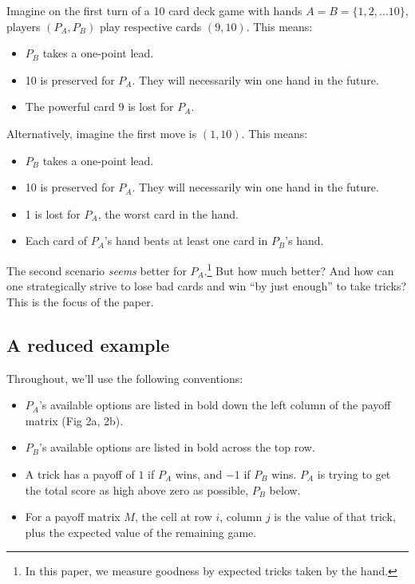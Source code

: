 \documentclass[11pt, oneside]{article} 	%
\begin{document}
Imagine on the first turn of a 10 card deck game with hands $A=B=\{1, 2, ... 10\}$, players $(P_A, P_B)$ play respective cards $(9, 10)$. This means:
\begin{itemize}
\item $P_B$ takes a one-point lead.
\item 10 is preserved for $P_A$. They will necessarily win one hand in the future.
\item The powerful card 9 is lost for $P_A$.
\end{itemize}

Alternatively, imagine the first move is $(1,10)$. This means:

\begin{itemize}
\item $P_B$ takes a one-point lead.
\item 10 is preserved for $P_A$. They will necessarily win one hand in the future.
\item 1 is lost for $P_A$, the worst card in the hand.
\item Each card of $P_A$'s hand beats at least one card in $P_B$'s hand.
\end{itemize}

The second scenario \emph{seems} better for $P_A$.\footnote{In this paper, we measure goodness by expected tricks taken by the hand.} But how much better? And how can one strategically strive to lose bad cards and win ``by just enough'' to take tricks? This is the focus of the paper.

\subsection{A reduced example}

Throughout, we'll use the following conventions:
\begin{itemize}
\item $P_A$'s available options are listed in bold down the left column of the payoff matrix (Fig 2a, 2b).
\item $P_B$'s available options are listed in bold across the top row.
\item A trick has a payoff of $1$ if $P_A$ wins, and $-1$ if $P_B$ wins. $P_A$ is trying to get the total score as high above zero as possible, $P_B$ below.
\item For a payoff matrix $M$, the cell at row $i$, column $j$ is the value of that trick, plus the expected value of the remaining game.
\end{itemize}
\end{document}
